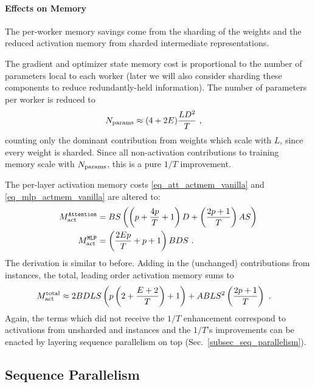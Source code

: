 \documentclass[11pt]{article}
\begin{document}
\paragraph{Effects on Memory} The per-worker memory savings come from the sharding of the weights
and the reduced activation memory from sharded intermediate representations.

The gradient and optimizer state memory cost is proportional to the number of parameters local to
each worker (later we will also consider sharding these components to reduce redundantly-held
information). The number of parameters per worker is reduced to
\begin{align}
	N _{ \rm params } & \approx  (4 + 2E) \frac{ L D ^{ 2 } }{ T }\ ,
	\label{eq_approx_params_tensor_parallel}
\end{align}
counting only the dominant contribution from weights which scale with $ L $, since every weight is
sharded. Since all non-activation contributions to training memory scale with $ N _{ {\rm params}  }
$, this is a pure $ 1/T $ improvement.

The per-layer activation memory costs \eqref{eq_att_actmem_vanilla} and
\eqref{eq_mlp_actmem_vanilla} are altered to:
\begin{align}
	M _{ \rm act  } ^\texttt{Attention} & = BS \left ( \left (p + \frac{ 4p }{ T }+1 \right )D + \left
		(\frac{ 2p+1 }{ T } \right )AS  \right ) \nonumber\\
	M _{ \rm act  } ^\texttt{MLP}       & = \left (\frac{ 2Ep }{ T }+p+1 \right )BDS\ .
	\label{eq_act_mem_attn_mlp}
\end{align}
The derivation is similar to before. Adding in the (unchanged) contributions from
 instances, the total, leading order activation memory sums to
\begin{align}
	M _{ {\rm act}  } ^{ {\rm  total}  } & \approx  2BDLS   \left ( p \left (2+ \frac{ E+2 }{ T }\right ) + 1   \right )
	+ ABLS ^{ 2 } \left ( \frac{ 2p+1 }{ T }\right ) \label{eq_act_mem_total_tensor_parallel}\ .
\end{align}
Again, the terms which did not receive the $ 1/T $ enhancement correspond to activations from
unsharded  and  instances and the $ 1/T $'s improvements can
be enacted by layering sequence parallelism on top (Sec.~\ref{subsec_seq_parallelism}).


\subsection{Sequence Parallelism \label{subsec_seq_parallelism}}
\end{document}
